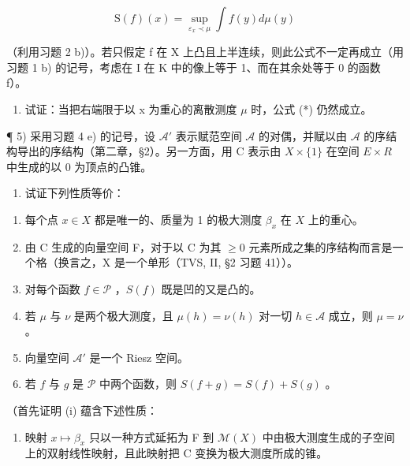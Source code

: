 \[
\mathrm{S} (f) (x) = \sup _ {\varepsilon_ {x} \prec \mu} \int f (y) d \mu (y)\tag{*}
\]

（利用习题 2 b)）。若只假定 f 在 X 上凸且上半连续，则此公式不一定再成立（用习题 1 b) 的记号，考虑在 I 在 K 中的像上等于 1、而在其余处等于 0 的函数 f）。

\begin{enumerate}
\def\labelenumi{\alph{enumi})}
\setcounter{enumi}{5}
\tightlist
\item
  试证：当把右端限于以 x 为重心的离散测度 \(\mu\) 时，公式 (*) 仍然成立。
\end{enumerate}

¶ 5) 采用习题 4 e) 的记号，设 \(\mathcal{A}'\) 表示赋范空间 \(\mathcal{A}\) 的对偶，并赋以由 \(\mathcal{A}\) 的序结构导出的序结构（第二章，§2）。另一方面，用 C 表示由 \(X \times \{1\}\) 在空间 \(E \times R\) 中生成的以 0 为顶点的凸锥。

\begin{enumerate}
\def\labelenumi{\alph{enumi})}
\tightlist
\item
  试证下列性质等价：
\end{enumerate}

\begin{enumerate}
\def\labelenumi{(\roman{enumi})}
\item
  每个点 \(x \in X\) 都是唯一的、质量为 1 的极大测度 \(\beta_x\) 在 \(X\) 上的重心。
\item
  由 C 生成的向量空间 F，对于以 C 为其 \(\geqslant0\) 元素所成之集的序结构而言是一个格（换言之，X 是一个单形（TVS, II, §2 习题 41））。
\item
  对每个函数 \(f \in \mathcal{P}\) ，\(S(f)\) 既是凹的又是凸的。
\item
  若 \(\mu\) 与 \(\nu\) 是两个极大测度，且 \(\mu(h) = \nu(h)\) 对一切 \(h \in \mathcal{A}\) 成立，则 \(\mu = \nu\) 。
\item
  向量空间 \(\mathcal{A}'\) 是一个 Riesz 空间。
\item
  若 \(f\) 与 \(g\) 是 \(\mathcal{P}\) 中两个函数，则 \(S(f + g) = S(f) + S(g)\) 。
\end{enumerate}

（首先证明 (i) 蕴含下述性质：

\begin{enumerate}
\def\labelenumi{(\roman{enumi})}
\setcounter{enumi}{6}
\tightlist
\item
  映射 \(x \mapsto \beta_{x}\) 只以一种方式延拓为 F 到 \(\mathcal{M}(X)\) 中由极大测度生成的子空间上的双射线性映射，且此映射把 C 变换为极大测度所成的锥。
\end{enumerate}


